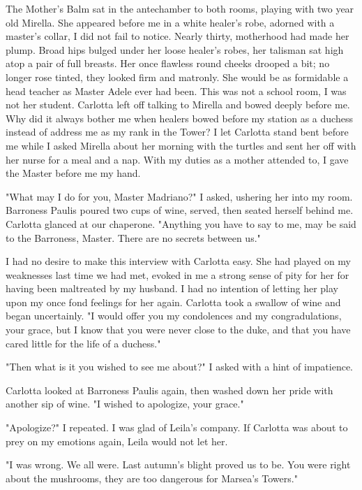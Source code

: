 \documentclass{article}
\begin{document}
The Mother's Balm sat in the antechamber to both rooms, playing with two year old Mirella. She appeared before me in a white healer's robe, adorned with a master's collar, I did not fail to notice.  Nearly thirty, motherhood had made her plump. Broad hips bulged under her loose healer's robes, her talisman sat high atop a pair of full breasts. Her once flawless round cheeks drooped a bit; no longer rose tinted, they looked firm and matronly. She would be as formidable a head teacher as Master Adele ever had been. This was not a school room, I was not her student. Carlotta left off talking to Mirella and bowed deeply before me. Why did it always bother me when healers bowed before my station as a duchess instead of address me as my rank in the Tower? I let Carlotta stand bent before me while I asked Mirella about her morning with the turtles and sent her off with her nurse for a meal and a nap. With my duties as a mother attended to, I gave the Master before me my hand. 

"What may I do for you, Master Madriano?" I asked, ushering her into my room. Barroness Paulis poured two cups of wine, served, then seated herself behind me. Carlotta glanced at our chaperone. "Anything you have to say to me, may be said to the Barroness, Master. There are no secrets between us."

I had no desire to make this interview with Carlotta easy. She had played on my weaknesses last time we had met, evoked in me a strong sense of pity for her for having been maltreated by my husband. I had no intention of letting her play upon my once fond feelings for her again. Carlotta took a swallow of wine and began uncertainly. "I would offer you my condolences and my congradulations, your grace, but I know that you were never close to the duke, and that you have cared little for the life of a duchess."

"Then what is it you wished to see me about?" I asked with a hint of impatience. 

Carlotta looked at Barroness Paulis again, then washed down her pride with another sip of wine. "I wished to apologize, your grace."

"Apologize?" I repeated. I was glad of Leila's company. If Carlotta was about to prey on my emotions again, Leila would not let her.

"I was wrong. We all were. Last autumn's blight proved us to be. You were right about the mushrooms, they are too dangerous for Marsea's Towers." 
\end{document}
